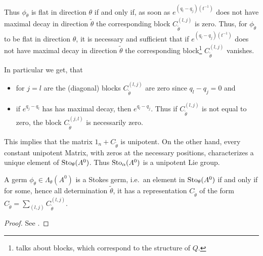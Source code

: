 \begin{paracol}{2}
\switchcolumn[0]\noindent
  Thus $\phi_\theta$ is flat in direction $\theta$ if and only if, as soon as
  $e^{(q_l-q_j)(t^{-1})}$ does not have maximal decay in direction
  $\tilde\theta$ the corresponding block $C_{\tilde\theta}^{(l,j)}$ is zero.
\switchcolumn[1]\noindent
  Thus, for $\phi_{\tilde\theta}$ to be flat in direction $\theta$, it is
  necessary and sufficient that if $e^{(q_l-q_j)(t^{-1})}$ does not have
  maximal decay in direction $\tilde\theta$ the corresponding
  block\footnote{\cite{Loday1994} talks about blocks, which correspond to the
  structure of $Q$.} $C_{\tilde\theta}^{(l,j)}$ vanishes.
\end{paracol}
In particular we get, that
\begin{itemize}
  \item for $j=l$ are the (diagonal) blocks $C_{\tilde\theta}^{(l,j)}$ are zero
    since $q_l-q_j=0$ and
  \item if $e^{q_j-q_l}$ has has maximal decay, then $e^{q_l-q_j}$. Thus if
    $C_{\tilde\theta}^{(l,j)}$ is not equal to zero, the block 
    $C_{\tilde\theta}^{(j,l)}$ is necessarily zero.
\end{itemize}
This implies that the matrix $1_n+C_{\tilde\theta}$ is unipotent.
On the other hand, every constant unipotent Matrix, with zeros at the necessary
positions, characterizes a unique element of $\operatorname{Sto}_\theta(A^0)$.
Thus $\operatorname{Sto}_\alpha(A^0)$ is a unipotent Lie group.

\begin{lem}
  A germ $\phi_\theta\in\Lambda_\theta(A^0)$ is a Stokes germ, i.e.\ an element
  in $\operatorname{Sto}_\theta(A^0)$ if and only if for some, hence all determination
  $\tilde\theta$, it has a representation $C_{\tilde\theta}$ of the form 
  $ C_{\tilde\theta}=\sum_{(l,j)}C_{\tilde\theta}^{(l,j)}$.
\end{lem}
\begin{proof}
  See \cite[Def.I.4.12]{Loday1994}.
  \TODO
\end{proof}

\begin{comment}
  If we fix a normal solution $X_0=e^Le^{Q(1/x)}$
  \begin{lem}
    Each germ $\phi_\theta\in\Lambda_\theta(A^0)$ is representable, relative to
    $X_{0,\tilde\theta}$, by a unique matrix
    \[
      C_{X_{0,\tilde\theta}}=
        1+\sum_{(j,l)\mid q_j \underset{\theta}{\prec} q_l} c_{(j,l)}E_{(j,l)}
    \]
    such that $\phi_\theta(x)
    =X_{0,\tilde\theta}(x)C_{X_{0,\tilde\theta}}X_{0,\tilde\theta}(x)^{-1}$ near
    $\theta$.

    \TODO

    \marginnote{\cite[Con.I.4.8]{Loday1994}}
    Thus the sheaf $\Lambda(A^0)$ is a sheaf of non-Abelian unipotent groups.
  \end{lem}
\end{comment}

